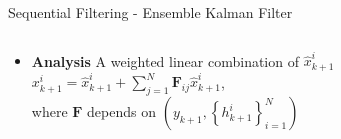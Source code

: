 \documentclass[aspectratio=169]{beamer} %
\begin{document}
\begin{frame}{Sequential Filtering - Ensemble Kalman Filter}
\begin{columns}
\begin{column}{0.6\textwidth}
\begin{itemize}
                \item<4-> \textbf{Analysis} \footnotemark[1] A weighted linear combination of $\hat x_{k+1}^i$ \\
                    $x^i_{k+1} = \hat x^i_{k+1} + \sum_{j=1}^N \bm F_{ij} \hat x^i_{k+1}$, \\ where $\bm F$ depends on $\left(y_{k+1}, \left\{h^i_{k+1}\right\}_{i=1}^N\right)$
            \end{itemize}
        \end{column}
        \begin{column}{0.4\textwidth}
            \begin{figure}
                \centering

\end{figure}
\end{column}
\end{columns}
\end{frame}
\end{document}
